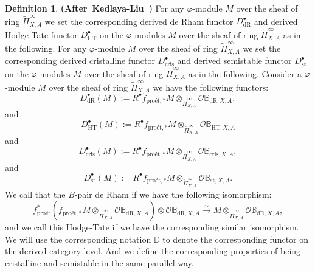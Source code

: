 \documentclass[12pt]{amsart}
\theoremstyle{definition}
\newtheorem{definition}[theorem]{Definition}
\numberwithin{equation}{section}
\begin{document}
\begin{definition} \mbox{\bf{(After Kedlaya-Liu \cite[Definition 8.6.5]{KL16})}} 
For any $\varphi$-module $M$ over the sheaf of ring $\widetilde{\Pi}^\infty_{X,A}$ we set the corresponding derived de Rham functor $D^\bullet_{\mathrm{dR}}$ and derived Hodge-Tate functor $D^\bullet_{\mathrm{HT}}$ on the $\varphi$-modules $M$ over the sheaf of ring $\widetilde{\Pi}^\infty_{X,A}$ as in the following.  For any $\varphi$-module $M$ over the sheaf of ring $\widetilde{\Pi}^\infty_{X,A}$ we set the corresponding derived cristalline functor $D^\bullet_{\mathrm{cris}}$ and derived semistable functor $D^\bullet_{\mathrm{st}}$ on the $\varphi$-modules $M$ over the sheaf of ring $\widetilde{\Pi}^\infty_{X,A}$ as in the following. Consider a $\varphi$-module $M$ over the sheaf of ring $\widetilde{\Pi}^\infty_{X,A}$ we have the following functors:
\begin{displaymath}
D_{\mathrm{dR}}^\bullet(M):=R^\bullet f_{\text{pro\'et},*} M\otimes_{\widetilde{\Pi}^\infty_{X,A}}	 \mathcal{O}\mathbb{B}_{\mathrm{dR},X,A},
\end{displaymath}
and
\begin{displaymath}
D_{\mathrm{HT}}^\bullet(M):=R^\bullet f_{\text{pro\'et},*} M \otimes_{\widetilde{\Pi}^\infty_{X,A}}	 \mathcal{O}\mathbb{B}_{\mathrm{HT},X,A}
\end{displaymath}
and
\begin{displaymath}
D_{\mathrm{cris}}^\bullet(M):=R^\bullet f_{\text{pro\'et},*} M\otimes_{\widetilde{\Pi}^\infty_{X,A}}	 \mathcal{O}\mathbb{B}_{\mathrm{cris},X,A},
\end{displaymath}
and
\begin{displaymath}
D_{\mathrm{st}}^\bullet(M):=R^\bullet f_{\text{pro\'et},*} M \otimes_{\widetilde{\Pi}^\infty_{X,A}}	 \mathcal{O}\mathbb{B}_{\mathrm{st},X,A}.
\end{displaymath}
We call that the $B$-pair de Rham if we have the following isomorphism:
\begin{displaymath}
f^*_\text{pro\'et}(f_{\text{pro\'et},*} M\otimes_{\widetilde{\Pi}^\infty_{X,A}}	 \mathcal{O}\mathbb{B}_{\mathrm{dR},X,A})\otimes\mathcal{O}\mathbb{B}_{\mathrm{dR},X,A} \overset{\sim}{\rightarrow} M \otimes_{\widetilde{\Pi}^\infty_{X,A}}	 \mathcal{O}\mathbb{B}_{\mathrm{dR},X,A},
\end{displaymath}
and we call this Hodge-Tate if we have the corresponding similar isomorphism. We will use the corresponding notation $\mathbb{D}$ to denote the corresponding functor on the derived category level. And we define the corresponding properties of being cristalline and semistable in the same parallel way.
	
\end{definition}
\end{document}
